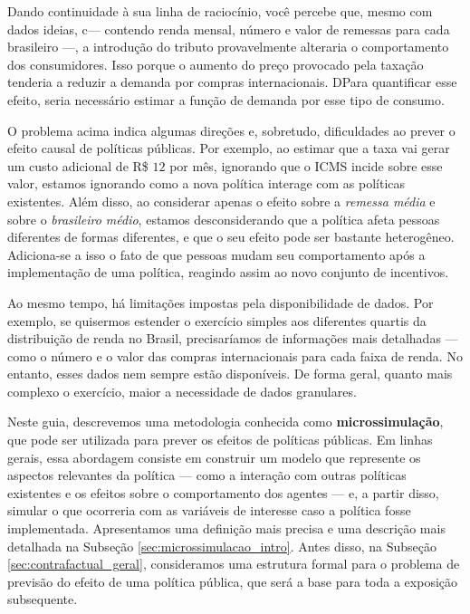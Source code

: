 \documentclass[12pt]{article}
\theoremstyle{break}
\begin{document}
Dando continuidade à sua linha de raciocínio, você percebe que, mesmo com dados ideias, c— contendo renda mensal, número e valor de remessas para cada brasileiro —, a introdução do tributo provavelmente alteraria o comportamento dos consumidores. Isso porque o aumento do preço provocado pela taxação tenderia a reduzir a demanda por compras internacionais. DPara quantificar esse efeito, seria necessário estimar a função de demanda por esse tipo de consumo. 


\hfill\break

\noindent O problema acima indica algumas direções e, sobretudo, dificuldades ao prever o efeito causal de políticas públicas. Por exemplo, ao estimar que a taxa vai gerar um custo adicional de R\$ $12$ por mês, ignorando que o ICMS incide sobre esse valor, estamos ignorando como a nova política interage com as políticas existentes. Além disso, ao considerar apenas o efeito sobre a \textit{remessa média} e sobre o \textit{brasileiro médio}, estamos desconsiderando que a política afeta pessoas diferentes de formas diferentes, e que o seu efeito pode ser bastante heterogêneo. Adiciona-se a isso o fato de que pessoas mudam seu comportamento após a implementação de uma política, reagindo assim ao novo conjunto de incentivos. 

Ao mesmo tempo, há limitações impostas pela disponibilidade de dados. Por exemplo, se quisermos estender o exercício simples aos diferentes quartis da distribuição de renda no Brasil, precisaríamos de informações mais detalhadas — como o número e o valor das compras internacionais para cada faixa de renda. No entanto, esses dados nem sempre estão disponíveis. De forma geral, quanto mais complexo o exercício, maior a necessidade de dados granulares. 

Neste guia, descrevemos uma metodologia conhecida como \textbf{microssimulação}, que pode ser utilizada para prever os efeitos de políticas públicas. Em linhas gerais, essa abordagem consiste em construir um modelo que represente os aspectos relevantes da política — como a interação com outras políticas existentes e os efeitos sobre o comportamento dos agentes — e, a partir disso, simular o que ocorreria com as variáveis de interesse caso a política fosse implementada.  Apresentamos uma definição mais precisa e uma descrição mais detalhada na Subseção \ref{sec:microssimulacao_intro}. Antes disso, na Subseção \ref{sec:contrafactual_geral}, consideramos uma estrutura formal para o problema de previsão do efeito de uma política pública, que será a base para toda a exposição subsequente.
\end{document}
